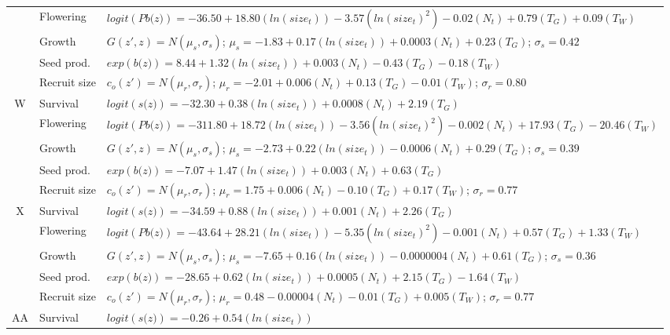 \documentclass[12pt, letterpaper]{article}
\begin{document}
\begin{spacing}{1.3}
\begin{longtable}[ht]{c|l|p{}}
         \rowcolor[gray]{.95}& Flowering  & $logit(\textit{Pb(z)})  = -36.50 + 18.80(ln(size_t)) -3.57(ln(size_t)^2)-0.02 (N_t) + 0.79 (T_G) +0.09 (T_W)$ \\
         & Growth  &  $G(z',z) = N(\mu_s, \sigma_s)$; $\mu_s = -1.83 + 0.17(ln(size_t)) + 0.0003 (N_t) + 0.23 (T_G)$; $\sigma_s = 0.42$\\
         \rowcolor[gray]{.95}& Seed prod.  & $exp(\textit{b(z)}) = 8.44 + 1.32(ln(size_t)) + 0.003 (N_t) -0.43 (T_G) - 0.18 (T_W)$  \\
         & Recruit size  &  $c_o(z') = N(\mu_r, \sigma_r)$; $\mu_r = -2.01 + 0.006 (N_t) + 0.13 (T_G) -0.01 (T_W) $; $\sigma_r = 0.80$ \\
         \hline
         \rowcolor[gray]{.95}W  &  Survival  &  $logit(\textit{s(z)})= -32.30 + 0.38(ln(size_t)) +0.0008(N_t) + 2.19(T_G)$ \\
         & Flowering  & $logit(\textit{Pb(z)})  = -311.80 + 18.72(ln(size_t)) -3.56(ln(size_t)^2)-0.002 (N_t) + 17.93 (T_G) -20.46 (T_W)$ \\
         \rowcolor[gray]{.95}& Growth  &  $G(z',z) = N(\mu_s, \sigma_s)$; $\mu_s = -2.73 + 0.22(ln(size_t)) -0.0006 (N_t) + 0.29 (T_G)$; $\sigma_s = 0.39$\\
         & Seed prod.  & $exp(\textit{b(z)}) = -7.07 + 1.47(ln(size_t)) + 0.003 (N_t) +0.63(T_G)$  \\
         \rowcolor[gray]{.95}& Recruit size  &  $c_o(z') = N(\mu_r, \sigma_r)$; $\mu_r = 1.75 + 0.006 (N_t) - 0.10 (T_G) + 0.17 (T_W) $; $\sigma_r = 0.77$ \\
         \hline
         X  &  Survival  &  $logit(\textit{s(z)})= -34.59 + 0.88(ln(size_t)) +0.001(N_t) + 2.26(T_G)$ \\
         \rowcolor[gray]{.95}& Flowering  & $logit(\textit{Pb(z)})  = -43.64 + 28.21(ln(size_t)) -5.35(ln(size_t)^2)-0.001 (N_t) + 0.57 (T_G) +1.33 (T_W)$ \\
         & Growth  &  $G(z',z) = N(\mu_s, \sigma_s)$; $\mu_s = -7.65 + 0.16(ln(size_t)) -0.0000004 (N_t) + 0.61 (T_G)$; $\sigma_s = 0.36$\\
         \rowcolor[gray]{.95}& Seed prod.  & $exp(\textit{b(z)}) = -28.65 + 0.62(ln(size_t)) + 0.0005 (N_t) +2.15(T_G) - 1.64 (T_W)$  \\
         & Recruit size  &  $c_o(z') = N(\mu_r, \sigma_r)$; $\mu_r = 0.48 - 0.00004 (N_t) - 0.01 (T_G) + 0.005 (T_W) $; $\sigma_r = 0.77$ \\
         \hline
         \rowcolor[gray]{.95}AA  &  Survival  &  $logit(\textit{s(z)})= -0.26 + 0.54(ln(size_t))$ \\

\end{longtable}
\end{spacing}
\end{document}
